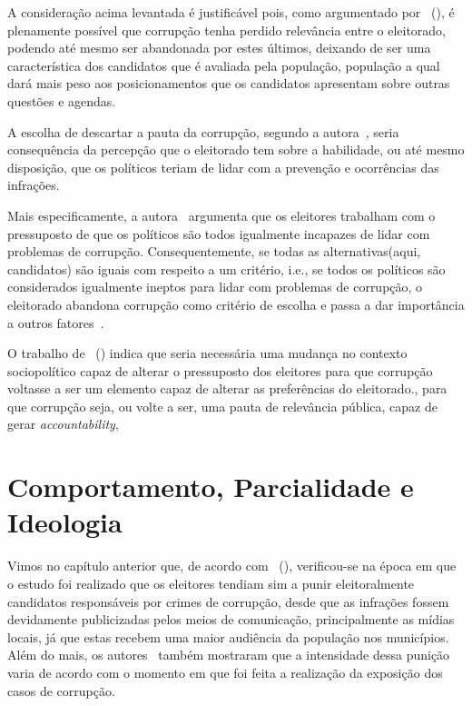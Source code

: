 \documentclass[
	12pt,				%
	openright,			%
	twoside,			%
	a4paper,			%
	openany,
	english,			%
	brazil				%
	]{abntex2}
\begin{document}
A consideração acima levantada é justificável pois, como argumentado por ~(\citeyear{Pavao2018Jul}), é plenamente possível que corrupção tenha perdido relevância entre o eleitorado, podendo até mesmo ser abandonada por estes últimos, deixando de ser uma característica dos candidatos que é avaliada pela população, população a qual dará mais peso aos posicionamentos que os candidatos apresentam sobre outras questões e agendas.

A escolha de descartar a pauta da corrupção, segundo a autora~\cite{Pavao2018Jul}, seria consequência da percepção que o eleitorado tem sobre a habilidade, ou até mesmo disposição, que os políticos teriam de lidar com a prevenção e ocorrências das infrações.

Mais especificamente, a autora~\cite{Pavao2018Jul} argumenta que os eleitores trabalham com o pressuposto de que os políticos são todos igualmente incapazes de lidar com problemas de corrupção. Consequentemente, se todas as alternativas(aqui, candidatos) são iguais com respeito a um critério, i.e., se todos os políticos são considerados igualmente ineptos para lidar com problemas de corrupção, o eleitorado abandona corrupção como critério de escolha e passa a dar importância a outros fatores~\cite{Pavao2018Jul}.

O trabalho de ~(\cite{Pavao2018Jul}) indica que seria necessária uma mudança no contexto sociopolítico capaz de alterar o pressuposto dos eleitores para que corrupção voltasse a ser um elemento capaz de alterar as preferências do eleitorado., para que corrupção seja, ou volte a ser, uma pauta de relevância pública, capaz de gerar \textit{accountability}, 


\chapter{Comportamento, Parcialidade e Ideologia}\label{cap_trabalho_academico}


Vimos no capítulo anterior que, de acordo com ~(\citeyear{ferraz2008exposing}), verificou-se na época em que o estudo foi realizado que os eleitores tendiam sim a punir eleitoralmente candidatos responsáveis por crimes de corrupção, desde que as infrações fossem devidamente publicizadas pelos meios de comunicação, principalmente as mídias locais, já que estas recebem uma maior audiência da população nos municípios. Além do mais, os autores~\cite{ferraz2008exposing} também mostraram que a intensidade dessa punição varia de acordo com o momento em que foi feita a realização da exposição dos casos de corrupção.
\end{document}
